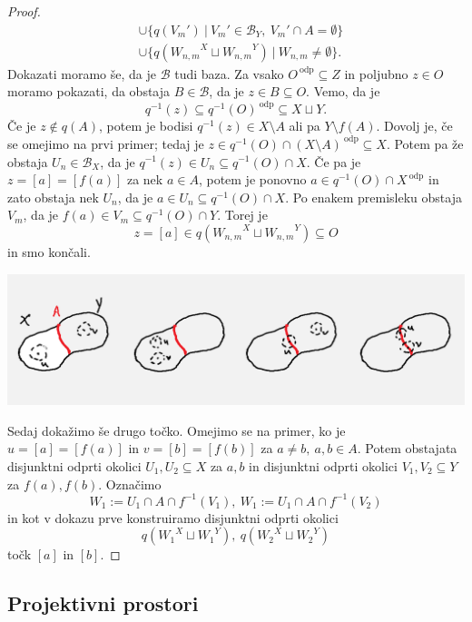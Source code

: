 \documentclass[10pt, a4paper]{article}
\newenvironment{noticeC}{%
  \tcolorbox[%
  notitle,
  empty,
  enhanced,  %
  breakable,
  coltext=black, 
  fontupper=\rmfamily,
  parbox=false,
  noparskip,
  sharp corners,
  boxrule=-1pt,  %
  frame hidden,
  left=7pt,  %
  right=7pt,
  top=5pt,
  bottom=5pt,
  before skip=2.5ex plus 2pt,
  after skip=2.5ex plus 2pt,
  overlay unbroken and last={%
  },
  ]}
{\endtcolorbox}
\newenvironment{dokaz}%
  {\begin{noticeC}\begin{proof}}%
  {\end{proof}\end{noticeC}}
\begin{document}
\begin{dokaz}
\begin{align*}
    &\cup \{q(V_m')\ |\ V_m' \in \mathcal{B}_Y,\ V_m' \cap A = \emptyset\}\\
    &\cup \{q({W_{n, m} }^{X} \sqcup {W_{n, m} }^{Y})\ |\ W_{n, m} \neq \emptyset\}.
  \end{align*}
  Dokazati moramo še, da je $\mathcal{B}$ tudi baza.
  Za vsako $O^{\ \text{odp}} \subseteq Z$ in poljubno $z \in O$ moramo 
  pokazati, da obstaja $B \in \mathcal{B}$, da je $z \in B \subseteq O$.
  Vemo, da je $$q^{-1} (z) \subseteq q^{-1} (O)^{\ \text{odp}} \subseteq X \sqcup Y.$$
  Če je $z \notin q(A)$, potem je bodisi $q^{-1} (z) \in X \setminus A$ ali pa $Y \setminus f(A)$.
  Dovolj je, če se omejimo na prvi primer; tedaj je $z \in q^{-1} (O) \cap (X \setminus A)^{\ \text{odp}} \subseteq X$.
  Potem pa že obstaja $U_n \in \mathcal{B}_X$, da je $q^{-1}(z) \in U_n \subseteq q^{-1} (O) \cap X$.
  Če pa je $z = [a] = [f(a)]$ za nek $a \in A$, potem je ponovno 
  $a \in q^{-1} (O) \cap X^{\ \text{odp}}$ in zato obstaja nek $U_n$,
  da je $a \in U_n \subseteq q^{-1} (O) \cap X$. Po enakem premisleku obstaja $V_m$,
  da je $f(a) \in V_m \subseteq q^{-1} (O) \cap Y$.
  Torej je $$z = [a] \in q({W_{n, m} }^X \sqcup {W_{n, m} }^Y) \subseteq O$$
  in smo končali.
  \begin{center}
    \includegraphics[scale=0.75]{dokaz2.png}
  \end{center}
  Sedaj dokažimo še drugo točko. Omejimo se na primer, ko je 
  $u = [a] = [f(a)]$ in $v = [b] = [f(b)]$ za $a \neq b,\ a, b \in A$.
  Potem obstajata disjunktni odprti okolici $U_1, U_2 \subseteq X$ za $a, b$
  in disjunktni odprti okolici $V_1, V_2 \subseteq Y$ za $f(a), f(b)$.
  Označimo 
  $$W_1 := U_1 \cap A \cap f^{-1} (V_1),\ W_1 := U_1 \cap A \cap f^{-1} (V_2)$$
  in kot v dokazu prve konstruiramo disjunktni odprti okolici 
  $$q({W_1 }^{X} \sqcup {W_1 }^{Y}),\ q({W_2 }^{X} \sqcup {W_2 }^{Y})$$
  točk $[a]$ in $[b]$.
\end{dokaz}

\subsection{Projektivni prostori}
\end{document}

